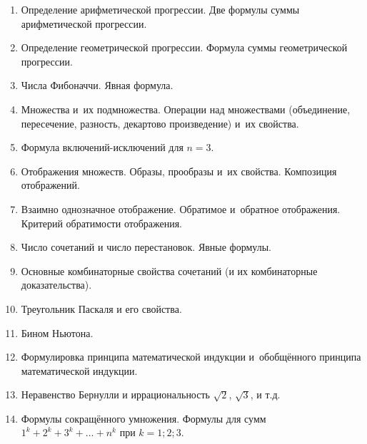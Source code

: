 \documentclass[a4paper,12pt]{article}
\begin{document}

\begin{enumerate}
\item Определение арифметической прогрессии. Две формулы суммы арифметической прогрессии.
\item Определение геометрической прогрессии. Формула суммы геометрической прогрессии.
\item Числа Фибоначчи. Явная формула.
\\


\item Множества и~их подмножества. Операции над множествами (объединение, пересечение, разность, декартово произведение) и~их свойства.
\item Формула включений-исключений для $n=3$.
\item Отображения множеств. Образы, прообразы и~их свойства. Композиция отображений.
\item Взаимно однозначное отображение. Обратимое и~обратное отображения. Критерий обратимости отображения.
\\


\item Число сочетаний и число перестановок. Явные формулы.
\item Основные комбинаторные свойства сочетаний (и их комбинаторные доказательства).
\item Треугольник Паскаля и его свойства.
\item Бином Ньютона.
\\


\item Формулировка принципа математической индукции и~обобщённого принципа математической индукции.
\item Неравенство Бернулли и иррациональность $\sqrt2$, $\sqrt3$, и т.д.
\item Формулы сокращённого умножения. Формулы для сумм $1^k+2^k+3^k+\ldots+n^k$ при $k=1;2;3$.
\\



\end{enumerate}
\end{document}
